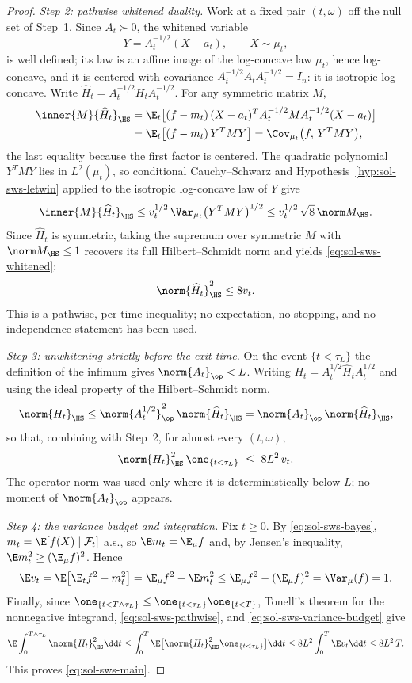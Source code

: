 \documentclass[../main.tex]{subfiles}
\begin{document}
\begin{proof}
\medskip
\noindent\emph{Step 2: pathwise whitened duality.}
Work at a fixed pair $(t,\omega)$ off the null set of Step~1.  Since $A_t\succ0$, the
whitened variable
\[
  Y=A_t^{-1/2}(X-a_t),
  \qquad X\sim\mu_t,
\]
is well defined; its law is an affine image of the log-concave law $\mu_t$, hence
log-concave, and it is centered with covariance
$A_t^{-1/2}A_tA_t^{-1/2}=I_n$: it is isotropic log-concave.  Write
$\widehat H_t=A_t^{-1/2}H_tA_t^{-1/2}$.  For any symmetric matrix $M$,
\begin{align*}
  \inner{M}{\widehat H_t}_{\HS}
  &=\E_t\bigl[(f-m_t)\,(X-a_t)^TA_t^{-1/2}MA_t^{-1/2}(X-a_t)\bigr]\\
  &=\E_t\bigl[(f-m_t)\,Y^TMY\bigr]
  =\Cov_{\mu_t}\bigl(f,\,Y^TMY\bigr),
\end{align*}
the last equality because the first factor is centered.  The quadratic polynomial
$Y^TMY$ lies in $L^2(\mu_t)$, so conditional Cauchy--Schwarz and
Hypothesis~\ref{hyp:sol-sws-letwin} applied to the isotropic log-concave law of $Y$ give
\[
  \inner{M}{\widehat H_t}_{\HS}
  \le v_t^{1/2}\,\Var_{\mu_t}\bigl(Y^TMY\bigr)^{1/2}
  \le v_t^{1/2}\,\sqrt8\,\norm M_{\HS}.
\]
Since $\widehat H_t$ is symmetric, taking the supremum over symmetric $M$ with
$\norm M_{\HS}\le1$ recovers its full Hilbert--Schmidt norm and yields
\eqref{eq:sol-sws-whitened}:
\[
  \norm{\widehat H_t}_{\HS}^2\le8v_t .
\]
This is a pathwise, per-time inequality; no expectation, no stopping, and no
independence statement has been used.

\medskip
\noindent\emph{Step 3: unwhitening strictly before the exit time.}
On the event $\{t<\tau_L\}$ the definition of the infimum gives
$\norm{A_t}_\op<L$.  Writing $H_t=A_t^{1/2}\widehat H_tA_t^{1/2}$ and using the ideal
property of the Hilbert--Schmidt norm,
\[
  \norm{H_t}_{\HS}
  \le\norm{A_t^{1/2}}_\op^2\,\norm{\widehat H_t}_{\HS}
  =\norm{A_t}_\op\,\norm{\widehat H_t}_{\HS},
\]
so that, combining with Step~2, for almost every $(t,\omega)$,
\begin{equation}
  \norm{H_t}_{\HS}^2\,\one_{\{t<\tau_L\}}\ \le\ 8L^2\,v_t .
  \label{eq:sol-sws-pathwise}
\end{equation}
The operator norm was used only where it is deterministically below $L$; no moment of
$\norm{A_t}_\op$ appears.

\medskip
\noindent\emph{Step 4: the variance budget and integration.}
Fix $t\ge0$.  By \eqref{eq:sol-sws-bayes}, $m_t=\E[f(X)\mid\mathcal F_t]$ a.s., so
$\E m_t=\E_\mu f$ and, by Jensen's inequality, $\E m_t^2\ge(\E_\mu f)^2$.  Hence
\begin{equation}
  \E v_t=\E\bigl[\E_tf^2-m_t^2\bigr]
  =\E_\mu f^2-\E m_t^2
  \le\E_\mu f^2-(\E_\mu f)^2
  =\Var_\mu(f)=1 .
  \label{eq:sol-sws-variance-budget}
\end{equation}
Finally, since $\one_{\{t<T\wedge\tau_L\}}\le\one_{\{t<\tau_L\}}\one_{\{t<T\}}$,
Tonelli's theorem for the nonnegative integrand, \eqref{eq:sol-sws-pathwise}, and
\eqref{eq:sol-sws-variance-budget} give
\[
  \E\int_0^{T\wedge\tau_L}\norm{H_t}_{\HS}^2\dd t
  \le\int_0^T\E\bigl[\norm{H_t}_{\HS}^2\one_{\{t<\tau_L\}}\bigr]\dd t
  \le8L^2\int_0^T\E v_t\dd t
  \le8L^2\,T .
\]
This proves \eqref{eq:sol-sws-main}.
\end{proof}
\end{document}

